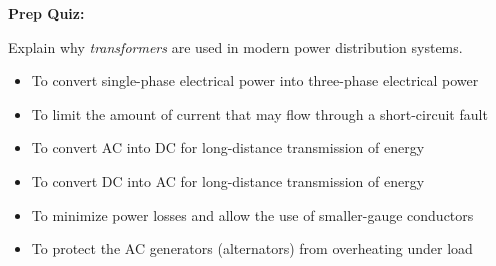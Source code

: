 \vfil \eject

\noindent
{\bf Prep Quiz:}

Explain why {\it transformers} are used in modern power distribution systems.

\begin{itemize}
\item{} To convert single-phase electrical power into three-phase electrical power
\vskip 5pt 
\item{} To limit the amount of current that may flow through a short-circuit fault
\vskip 5pt 
\item{} To convert AC into DC for long-distance transmission of energy
\vskip 5pt 
\item{} To convert DC into AC for long-distance transmission of energy
\vskip 5pt 
\item{} To minimize power losses and allow the use of smaller-gauge conductors
\vskip 5pt 
\item{} To protect the AC generators (alternators) from overheating under load
\end{itemize}




